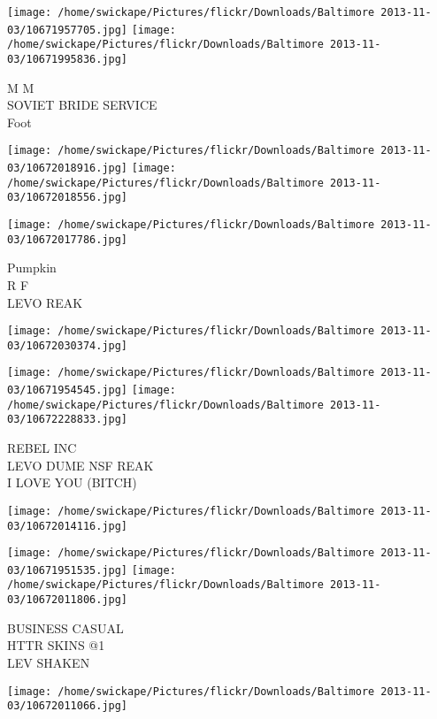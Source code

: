 \documentclass[10pt,letterpaper]{article}
\begin{document}
\vspace{0.25in}
\texttt{[image: /home/swickape/Pictures/flickr/Downloads/Baltimore 2013-11-03/10671957705.jpg]}
\texttt{[image: /home/swickape/Pictures/flickr/Downloads/Baltimore 2013-11-03/10671995836.jpg]}

M M\\
SOVIET BRIDE SERVICE\\
Foot\\
\pagebreak

\texttt{[image: /home/swickape/Pictures/flickr/Downloads/Baltimore 2013-11-03/10672018916.jpg]}
\texttt{[image: /home/swickape/Pictures/flickr/Downloads/Baltimore 2013-11-03/10672018556.jpg]}

\texttt{[image: /home/swickape/Pictures/flickr/Downloads/Baltimore 2013-11-03/10672017786.jpg]}

Pumpkin\\
R F\\
LEVO REAK\\
\pagebreak

\texttt{[image: /home/swickape/Pictures/flickr/Downloads/Baltimore 2013-11-03/10672030374.jpg]}

\vspace{0.25in}
\texttt{[image: /home/swickape/Pictures/flickr/Downloads/Baltimore 2013-11-03/10671954545.jpg]}
\texttt{[image: /home/swickape/Pictures/flickr/Downloads/Baltimore 2013-11-03/10672228833.jpg]}

REBEL INC\\
LEVO DUME NSF REAK\\
I LOVE YOU (BITCH)\\
\pagebreak

\texttt{[image: /home/swickape/Pictures/flickr/Downloads/Baltimore 2013-11-03/10672014116.jpg]}

\vspace{0.25in}
\texttt{[image: /home/swickape/Pictures/flickr/Downloads/Baltimore 2013-11-03/10671951535.jpg]}
\texttt{[image: /home/swickape/Pictures/flickr/Downloads/Baltimore 2013-11-03/10672011806.jpg]}

BUSINESS CASUAL\\
HTTR SKINS @1\\
LEV SHAKEN\\
\pagebreak

\texttt{[image: /home/swickape/Pictures/flickr/Downloads/Baltimore 2013-11-03/10672011066.jpg]}
\end{document}

